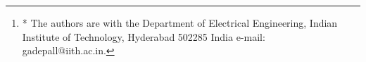 \documentclass[journal,12pt,twocolumn]{IEEEtran}
\begin{document}
\author{Y Aditya, G V S S Praneeth Varma and G V V Sharma$^{*}$%
\thanks{* The authors are with the Department
of Electrical Engineering, Indian Institute of Technology, Hyderabad
502285 India e-mail:  gadepall@iith.ac.in.}%
}
% 
%



% 







\maketitle
\end{document}
